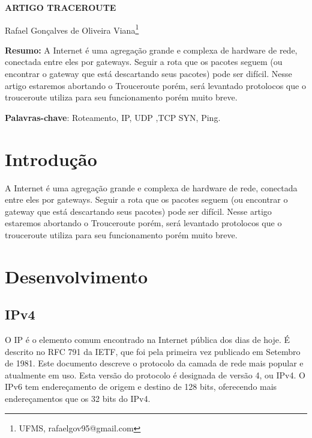 \documentclass[article,12pt,oneside,a4paper,english,brazil,sumario=tradicional]{abntex2}
\begin{document}
\frenchspacing %

\begin{center}
	\uppercase{\bfseries{Artigo Traceroute}}
	\vspace{12pt}
\end{center}

\begin{flushright}
    Rafael Gonçalves de Oliveira Viana\footnote{UFMS, rafaelgov95@gmail.com}
	\\
	\vspace{12pt}
\end{flushright}

\begin{footnotesize}
\SingleSpacing
\noindent
\small{\textbf{Resumo:}}
\noindent
\small
A Internet é uma agregação grande e complexa de hardware de rede, conectada entre eles por gateways. Seguir a rota que os pacotes seguem (ou encontrar o gateway que está descartando seus pacotes) pode ser difícil. 
Nesse artigo estaremos abortando o Trouceroute porém, será levantado protolocos que o trouceroute utiliza para seu funcionamento porém muito breve.

\noindent
\textbf{Palavras-chave}: Roteamento, IP, UDP ,TCP SYN, Ping.
\end{footnotesize}

\textual
\pagestyle{simple}


\section{Introdu\c c\~ao}
\label{secIntroducao}
\normalsize
A Internet é uma agregação grande e complexa de hardware de rede, conectada entre eles por gateways. Seguir a rota que os pacotes seguem (ou encontrar o gateway que está descartando seus pacotes) pode ser difícil. 
Nesse artigo estaremos abortando o Trouceroute porém, será levantado protolocos que o trouceroute utiliza para seu funcionamento porém muito breve.

\section{Desenvolvimento}

\subsection{IPv4}
O IP é o elemento comum encontrado na Internet pública dos dias de hoje. É descrito no RFC 791 da IETF, que foi pela primeira vez publicado em Setembro de 1981. Este documento descreve o protocolo da camada de rede mais popular e atualmente em uso. Esta versão do protocolo é designada de versão 4, ou IPv4. O IPv6 tem endereçamento de origem e destino de 128 bits, oferecendo mais endereçamentos que os 32 bits do IPv4.
\end{document}

